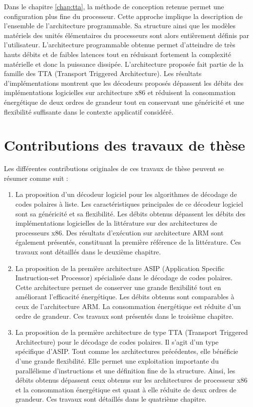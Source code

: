 Dans le chapitre \ref{chap:tta}, la méthode de conception retenue permet une configuration plus fine du processeur. Cette approche implique la description de l'ensemble de l'architecture programmable. Sa structure ainsi que les modèles matériels des unités élémentaires du processeurs sont alors entièrement définis par l'utilisateur. L'architecture programmable obtenue permet d'atteindre de très hauts débits et de faibles latences tout en réduisant fortement la complexité matérielle et donc la puissance dissipée. L'architecture proposée fait partie de la famille des TTA (Transport Triggered Architecture). Les résultats d'implémentations montrent que les décodeurs proposés dépassent les débits des implémentations logicielles sur architecture x86 et réduisent la consommation énergétique de deux ordres de grandeur tout en conservant une généricité et une flexibilité suffisante dans le contexte applicatif considéré.

\section*{Contributions des travaux de thèse}
Les différentes contributions originales de ces travaux de thèse peuvent se résumer comme suit : 
\begin{enumerate}
	\item La proposition d'un décodeur logiciel pour les algorithmes de décodage de codes polaires à liste. Les caractéristiques principales de ce décodeur logiciel sont sa généricité et sa flexibilité. Les débits obtenus dépassent les débits des implémentations logicielles de la littérature sur des architectures de processeurs x86. Des résultats d'exécution sur architecture ARM sont également présentés, constituant la première référence de la littérature. Ces travaux sont détaillés dans le deuxième chapitre.
  	\item La proposition de la première architecture ASIP (Application Specific Instruction-set Processor) spécialisée dans le décodage de codes polaires. Cette architecture permet de conserver une grande flexibilité tout en améliorant l'efficacité énergétique. Les débits obtenus sont comparables à ceux de l'architecture ARM. La consommation énergétique est réduite d'un ordre de grandeur. Ces travaux sont présentés dans le troisième chapitre.
  	\item La proposition de la première architecture de type TTA (Transport Triggered Architecture) pour le décodage de codes polaires. Il s'agit d'un type spécifique d'ASIP. Tout comme les architectures précédentes, elle bénéficie d'une grande flexibilité. Elle permet une exploitation importante du parallélisme d'instructions et une définition fine de la structure. Ainsi, les débits obtenus dépassent ceux obtenus sur les architectures de processeur x86 et la consommation énergétique est quant à elle réduite de deux ordres de grandeur. Ces travaux sont détaillés dans le quatrième chapitre.

\end{enumerate}

